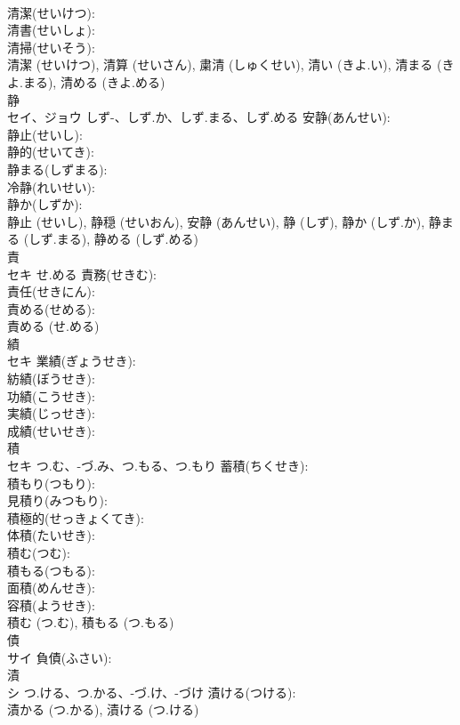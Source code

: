 \documentclass[8pt]{extreport}
\begin{document}
\begin{CJK}{UTF8}{min}
\\	清潔(せいけつ): 
\\	清書(せいしょ): 
\\	清掃(せいそう): 
\\	清潔 (せいけつ), 清算 (せいさん), 粛清 (しゅくせい), 清い (きよ.い), 清まる (きよ.まる), 清める (きよ.める)
\\	静			
\\	セイ、ジョウ	しず-、しず.か、しず.まる、しず.める	安静(あんせい): 
\\	静止(せいし): 
\\	静的(せいてき): 
\\	静まる(しずまる): 
\\	冷静(れいせい): 
\\	静か(しずか): 
\\	静止 (せいし), 静穏 (せいおん), 安静 (あんせい), 静 (しず), 静か (しず.か), 静まる (しず.まる), 静める (しず.める)
\\	責			
\\	セキ	せ.める	責務(せきむ): 
\\	責任(せきにん): 
\\	責める(せめる): 
\\	責める (せ.める)
\\	績			
\\	セキ		業績(ぎょうせき): 
\\	紡績(ぼうせき): 
\\	功績(こうせき): 
\\	実績(じっせき): 
\\	成績(せいせき): 
\\	積			
\\	セキ	つ.む、-づ.み、つ.もる、つ.もり	蓄積(ちくせき): 
\\	積もり(つもり): 
\\	見積り(みつもり): 
\\	積極的(せっきょくてき): 
\\	体積(たいせき): 
\\	積む(つむ): 
\\	積もる(つもる): 
\\	面積(めんせき): 
\\	容積(ようせき): 
\\	積む (つ.む), 積もる (つ.もる)
\\	債			
\\	サイ		負債(ふさい): 
\\	漬			
\\	シ	つ.ける、つ.かる、-づ.け、-づけ	漬ける(つける): 
\\	漬かる (つ.かる), 漬ける (つ.ける)

\end{CJK}
\end{document}
